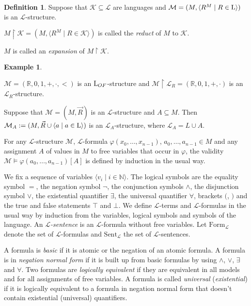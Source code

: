 \documentclass[10pt]{amsart}
\renewcommand{\L}{\mathcal{L}}
\newcommand{\LL}{{\rm{L}}}
\newcommand{\RR}{\mathbb{R}}
\newcommand{\NNN}{\mathbb{N}}
\newcommand{\MM}{\mathcal{M}}
\newcommand{\K}{\mathcal{K}}
\theoremstyle{definition}
\newtheorem{definition}[theorem]{Definition}
\newtheorem{example}[theorem]{Example}
\theoremstyle{remark}
\newenvironment{enumerate-(a)}{\begin{enumerate}[label={\upshape (\alph*)}, leftmargin=2pc]}{\end{enumerate}}
\begin{document}
\begin{definition} 
Suppose that $\K \subseteq \L$ are languages and $\MM=(M, \langle R^M\mid R\in\LL\rangle)$ is an $\L$-structure. 
\begin{enumerate-(a)} 
\item 
$M{\upharpoonright}\K=(M,\langle R^M\mid R\in\K\rangle)$ is called the \emph{reduct} of $M$ to $\K$. 
\item 
$M$ is called an \emph{expansion} of $M{\upharpoonright}\K$. 
\end{enumerate-(a)} 
\end{definition} 
\begin{example} 
\begin{enumerate-(a)} 
\item 
$\MM=(\RR,0,1,+,\cdot,<)$ is an $\LL_{OF}$-structure and $\MM{\upharpoonright}\L_R=(\RR,0,1,+,\cdot)$ is an $\L_R$-structure. 
\item 
Suppose that $\MM=(M,\vec{R})$ is an $\L$-structure and $A\subseteq M$. Then $\MM_A:=(M,\vec{R}\cup \langle a\mid a\in\LL\rangle)$ is an $\L_A$-structure, where $\L_A=L\cup A$. 
\end{enumerate-(a)} 
\end{example} 

For any $\L$-structure $\MM$, $\L$-formula $\varphi(x_0,\dots,x_{n-1})$, $a_0,\dots, a_{n-1}\in M$ and any assignment $A$ of values in $M$ to free variables that occur in $\varphi$, the validity $\MM\models \varphi(a_0,\dots,a_{n-1})[A]$ is defined by induction in the usual way. 

We fix a sequence of variables $\langle v_i\mid i\in\NNN\rangle$. The logical symbols are the equality symbol  $=$, the negation symbol $\neg$, the conjunction symbols $\wedge$, the disjunction symbol $\vee$, the existential quantifier $\exists$, the universal quantifier $\forall$, brackets $($, $)$ and the true and false statements $\top$ and $\bot$. We define $\L$-terms and $\L$-formulas in the usual way by induction from the variables, logical symbols and symbols of the language. 
An \emph{$\L$-sentence} is an $\L$-formula without free variables. 
Let $\mathrm{Form}_\L$ denote the set of $\L$-formulas and $\mathrm{Sent}_\L$ the set of $\L$-sentences. 

A formula is \emph{basic} if it is atomic or the negation of an atomic formula. A formula is in \emph{negation normal form} if it is built up from basic formulas by using $\wedge$, $\vee$, $\exists$ and $\forall$. Two formulas are \emph{logically equivalent} if they are equivalent in all models and for all assignments of free variables. A formula is called \emph{universal} (\emph{existential}) if it is logically equivalent to a formula in negation normal form that doesn't contain existential (universal) quantifiers. 
\end{document}
